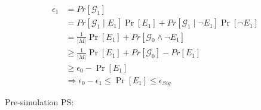 \documentclass[
]{article}
\begin{document}
\[
\begin{equation}
\begin{aligned}
\epsilon_1 &= Pr[\mathcal{G}_1] \\
&= Pr[\mathcal{G}_1\mid E_1]\Pr[E_1] + Pr[\mathcal{G}_1\mid \neg E_1]\Pr[\neg E_1] \\
&=\frac{1}{\left|M\right|}\Pr[E_1] + Pr[\mathcal{G}_0\wedge \neg E_1] \\
&\geq \frac{1}{\left|M\right|}\Pr[E_1] + Pr[\mathcal{G}_0] - Pr[E_1] \\
&\geq \epsilon_0 - \Pr[E_1] \\
&\Rightarrow \epsilon_0 - \epsilon_1 \leq \Pr[E_1] \le \epsilon_{Sig}
\end{aligned}
\end{equation}
\]

Pre-simulation PS:

\end{document}
